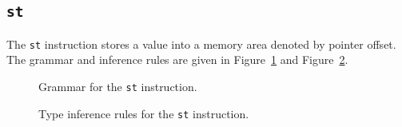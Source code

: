 \subsection{\texttt{st}}\label{subsec:nstar-instructionset-memory-st}

The \texttt{st} instruction stores a value into a memory area denoted by pointer offset.
The grammar and inference rules are given in Figure~\ref{fig:nstar-instructionset-memory-st-grammar} and Figure~\ref{fig:nstar-instructionset-memory-st-typerules}.

\begin{figure}[H]
  \centering


  \caption{Grammar for the \texttt{st} instruction.}
  \label{fig:nstar-instructionset-memory-st-grammar}
\end{figure}

\begin{figure}[H]
  \centering


  \caption{Type inference rules for the \texttt{st} instruction.}
  \label{fig:nstar-instructionset-memory-st-typerules}
\end{figure}

